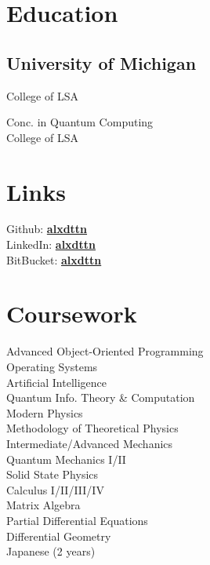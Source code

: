 \documentclass[letterpaper]{headers} %
\begin{document}

\begin{minipage}[t]{0.33\textwidth}
\section{Education}
	\subsection{University of Michigan}
		College of LSA \\

		\sectionspace
		
		Conc. in Quantum Computing \\
		College of LSA \\
\sectionspace

\section{Links}
	Github: \href{https://github.com/alxdttn}{\bf alxdttn}\\
	LinkedIn: \href{https://www.linkedin.com/in/alxdttn}{\bf alxdttn} \\
	BitBucket: \href{https://bitbucket.org/alxdttn}{\bf alxdttn}\\

\sectionspace

\section{Coursework}
	Advanced Object-Oriented Programming \\
	Operating Systems \\
	Artificial Intelligence \\
	Quantum Info. Theory \& Computation \\
	Modern Physics \\
	Methodology of Theoretical Physics \\
	Intermediate/Advanced Mechanics \\
	Quantum Mechanics I/II \\
	Solid State Physics \\
	Calculus I/II/III/IV \\
	Matrix Algebra \\
	Partial Differential Equations \\
	Differential Geometry \\
	Japanese (2 years) \\
\sectionspace


\end{minipage}
\end{document}

